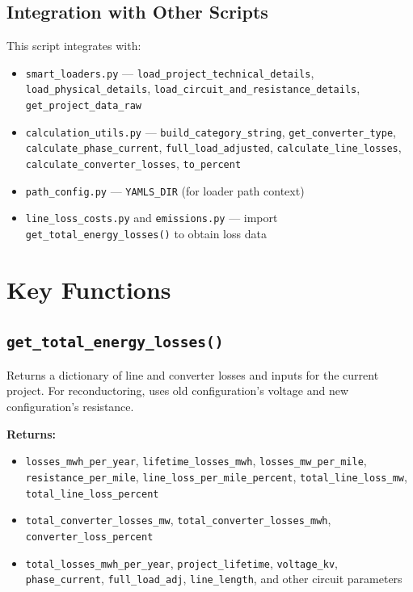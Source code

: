 \documentclass[ctcc_full_documentation.tex]{subfiles}
\begin{document}
\subsection{Integration with Other Scripts}

This script integrates with:
\begin{itemize}
    \item \texttt{smart\_loaders.py} --- \texttt{load\_project\_technical\_details}, \texttt{load\_physical\_details}, \texttt{load\_circuit\_and\_resistance\_details}, \texttt{get\_project\_data\_raw}
    \item \texttt{calculation\_utils.py} --- \texttt{build\_category\_string}, \texttt{get\_converter\_type}, \texttt{calculate\_phase\_current}, \texttt{full\_load\_adjusted}, \texttt{calculate\_line\_losses}, \texttt{calculate\_converter\_losses}, \texttt{to\_percent}
    \item \texttt{path\_config.py} --- \texttt{YAMLS\_DIR} (for loader path context)
    \item \texttt{line\_loss\_costs.py} and \texttt{emissions.py} --- import \texttt{get\_total\_energy\_losses()} to obtain loss data
\end{itemize}

\section{Key Functions}

\subsection{\texttt{get\_total\_energy\_losses()}}

Returns a dictionary of line and converter losses and inputs for the current project. For reconductoring, uses old configuration's voltage and new configuration's resistance.

\textbf{Returns:}
\begin{itemize}
    \item \texttt{losses\_mwh\_per\_year}, \texttt{lifetime\_losses\_mwh}, \texttt{losses\_mw\_per\_mile}, \texttt{resistance\_per\_mile}, \texttt{line\_loss\_per\_mile\_percent}, \texttt{total\_line\_loss\_mw}, \texttt{total\_line\_loss\_percent}
    \item \texttt{total\_converter\_losses\_mw}, \texttt{total\_converter\_losses\_mwh}, \texttt{converter\_loss\_percent}
    \item \texttt{total\_losses\_mwh\_per\_year}, \texttt{project\_lifetime}, \texttt{voltage\_kv}, \texttt{phase\_current}, \texttt{full\_load\_adj}, \texttt{line\_length}, and other circuit parameters
\end{itemize}
\end{document}
